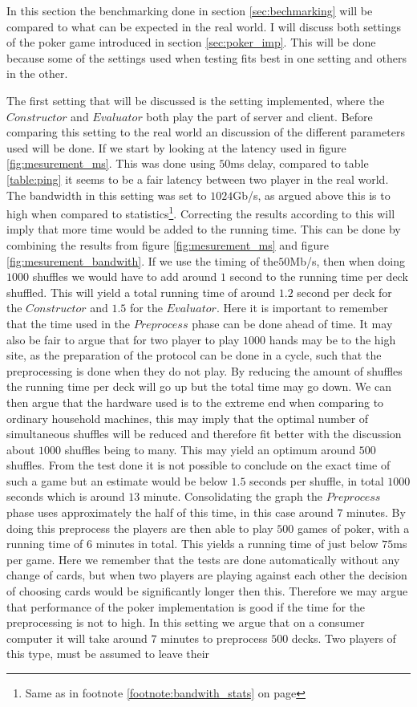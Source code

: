 \documentclass[twoside,11pt,openright]{report}
\begin{document}
In this section the benchmarking done in section \ref{sec:bechmarking} will be compared to what can be expected in the real world. I will discuss both settings of the poker game introduced in section \ref{sec:poker_imp}. This will be done because some of the settings used when testing fits best in one setting and others in the other.

The first setting that will be discussed is the setting implemented, where the $Constructor$ and $Evaluator$ both play the part of server and client. Before comparing this setting to the real world an discussion of the different parameters used will be done. If we start by looking at the latency used in figure \ref{fig:mesurement_ms}. This was done using $50$ms delay, compared to table \ref{table:ping} it seems to be a fair latency between two player in the real world. The bandwidth in this setting was set to $1024$Gb/s, as argued above this is to high when compared to statistics\footnote{Same as in footnote \ref{footnote:bandwith_stats} on page \pageref{footnote:bandwith_stats}}. Correcting the results according to this will imply that more time would be added to the running time. This can be done by combining the results from figure \ref{fig:mesurement_ms} and figure \ref{fig:mesurement_bandwith}. If we use the timing of the$50$Mb/s, then when doing $1000$ shuffles we would have to add around $1$ second to the running time per deck shuffled. This will yield a total running time of around $1.2$ second per deck for the $Constructor$ and $1.5$ for the $Evaluator$. Here it is important to remember that the time used in the $Preprocess$ phase can be done ahead of time. It may also be fair to argue that for two player to play $1000$ hands may be to the high site, as the preparation of the protocol can be done in a cycle, such that the preprocessing is done when they do not play. By reducing the amount of shuffles the running time per deck will go up but the total time may go down. We can then argue that the hardware used is to the extreme end when comparing to ordinary household machines, this may imply that the optimal number of simultaneous shuffles will be reduced and therefore fit better with the discussion about $1000$ shuffles being to many. This may yield an optimum around $500$ shuffles. From the test done it is not possible to conclude on the exact time of such a game but an estimate would be below $1.5$ seconds per shuffle, in total $1000$ seconds which is around $13$ minute. Consolidating the graph the $Preprocess$ phase uses approximately the half of this time, in this case around $7$ minutes. By doing this preprocess the players are then able to play $500$ games of poker, with a running time of $6$ minutes in total. This yields a running time of just below $75$ms per game. Here we remember that the tests are done automatically without any change of cards, but when two players are playing against each other the decision of choosing cards would be significantly longer then this. Therefore we may argue that performance of the poker implementation is good if the time for the preprocessing is not to high. In this setting we argue that on a consumer computer it will take around $7$ minutes to preprocess $500$ decks. Two players of this type, must be assumed to leave their 
\end{document}

